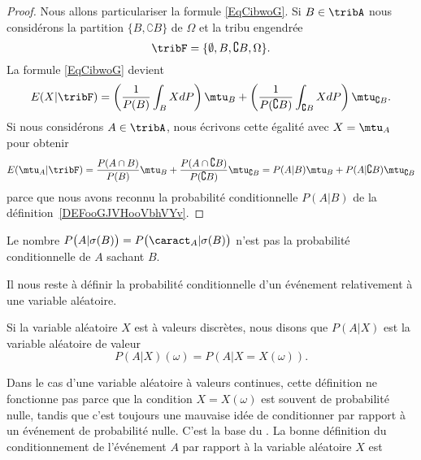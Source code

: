 \begin{proof}
	Nous allons particulariser la formule \eqref{EqCibwoG}. Si \( B\in \tribA\) nous considérons la partition \( \{ B,\complement B \}\) de \( \Omega\) et la tribu engendrée
	\begin{equation}
		\tribF=\{ \emptyset,B,\complement B,\Omega \}.
	\end{equation}
	La formule \eqref{EqCibwoG} devient
	\begin{equation}
		E(X|\tribF)=\left( \frac{1}{ P(B) }\int_BXdP \right)\mtu_B+\left( \frac{1}{ P(\complement B) }\int_{\complement B}XdP \right)\mtu_{\complement B}.
	\end{equation}
	Si nous considérons \( A\in\tribA\), nous écrivons cette égalité avec \( X=\mtu_A\) pour obtenir
	\begin{equation}
		E(\mtu_A|\tribF)=\frac{ P(A\cap B) }{ P(B) }\mtu_B+\frac{ P(A\cap\complement B) }{ P(\complement B) }\mtu_{\complement B} =P(A|B)\mtu_B+P(A|\complement B)\mtu_{\complement B}
	\end{equation}
	parce que nous avons reconnu la probabilité conditionnelle \( P(A|B)\) de la définition~\ref{DEFooGJVHooVbhVYv}.
\end{proof}

\begin{remark}
	Le nombre \(P\big( A |\sigma(B) \big)=P\big(\caract_A|\sigma(B)\big)\) n'est pas la probabilité conditionnelle de \( A\) sachant \( B\).
\end{remark}

Il nous reste à définir la probabilité conditionnelle d'un événement relativement à une variable aléatoire.

\begin{definition}      \label{DEFooFRLFooNvXuPK}
	Si la variable aléatoire \( X\) est à valeurs discrètes, nous disons que \( P(A|X)\) est la variable aléatoire de valeur
	\begin{equation}
		P(A|X)(\omega)=P(A|X=X(\omega)).
	\end{equation}
\end{definition}
Dans le cas d'une variable aléatoire à valeurs continues, cette définition ne fonctionne pas parce que la condition \( X=X(\omega)\) est souvent de probabilité nulle, tandis que c'est toujours une mauvaise idée de conditionner par rapport à un événement de probabilité nulle. C'est la base du . La bonne définition du conditionnement de l'événement \( A\) par rapport à la variable aléatoire \( X\) est

